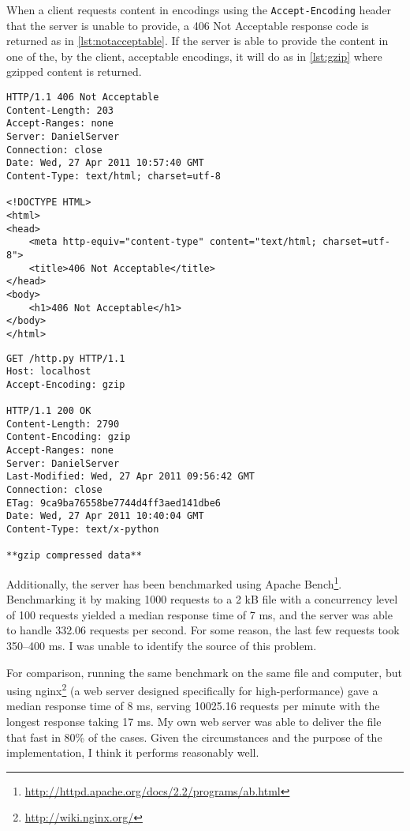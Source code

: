 \documentclass{sig-alternate}
\begin{document}
When a client requests content in encodings using the \verb+Accept-Encoding+
header that the server is unable to provide, a 406 Not Acceptable response
code is returned as in \autoref{lst:notacceptable}. If the server is able to
provide the content in one of the, by the client, acceptable encodings, it
will do as in \autoref{lst:gzip} where gzipped content is returned.

\begin{lstlisting}
HTTP/1.1 406 Not Acceptable
Content-Length: 203
Accept-Ranges: none
Server: DanielServer
Connection: close
Date: Wed, 27 Apr 2011 10:57:40 GMT
Content-Type: text/html; charset=utf-8

<!DOCTYPE HTML>
<html>
<head>
    <meta http-equiv="content-type" content="text/html; charset=utf-8">
    <title>406 Not Acceptable</title>
</head>
<body>
    <h1>406 Not Acceptable</h1>
</body>
</html>
\end{lstlisting}

\begin{lstlisting}
GET /http.py HTTP/1.1
Host: localhost
Accept-Encoding: gzip

HTTP/1.1 200 OK
Content-Length: 2790
Content-Encoding: gzip
Accept-Ranges: none
Server: DanielServer
Last-Modified: Wed, 27 Apr 2011 09:56:42 GMT
Connection: close
ETag: 9ca9ba76558be7744d4ff3aed141dbe6
Date: Wed, 27 Apr 2011 10:40:04 GMT
Content-Type: text/x-python

**gzip compressed data**
\end{lstlisting}

Additionally, the server has been benchmarked using Apache
Bench\footnote{\url{http://httpd.apache.org/docs/2.2/programs/ab.html}}.
Benchmarking it by making 1000 requests to a 2 kB file with a concurrency
level of 100 requests yielded a median response time of 7 ms, and the server
was able to handle 332.06 requests per second. For some reason, the last
few requests took 350--400 ms. I was unable to identify the source of this
problem.

For comparison, running the same benchmark on the same file and computer, but
using nginx\footnote{\url{http://wiki.nginx.org/}} (a web server designed
specifically for high-performance) gave a median response time of 8 ms,
serving 10025.16 requests per minute with the longest response taking 17 ms.
My own web server was able to deliver the file that fast in 80\% of the cases.
Given the circumstances and the purpose of the implementation, I think it
performs reasonably well.
\end{document}
